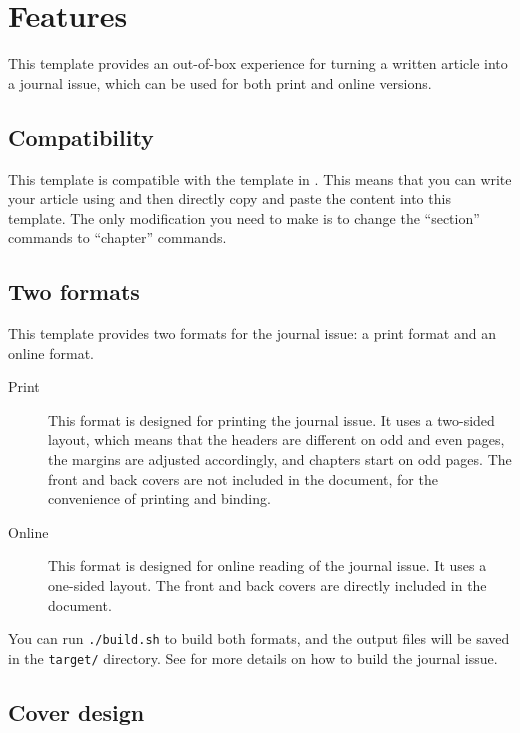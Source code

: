 \chapter{Features}
\label{chap:features}

This template provides an out-of-box experience for turning a written article into a journal issue, which can be used for both print and online versions.

\section{Compatibility}

This template is compatible with the template in \cite{article-template}.
This means that you can write your article using \cite{article-template} and then directly copy and paste the content into this template.
The only modification you need to make is to change the ``section'' commands to ``chapter'' commands.

\section{Two formats}

This template provides two formats for the journal issue: a print format and an online format.

\begin{description}
  \item[Print]
    This format is designed for printing the journal issue.
    It uses a two-sided layout, which means that the headers are different on odd and even pages, the margins are adjusted accordingly, and chapters start on odd pages.
    The front and back covers are not included in the document, for the convenience of printing and binding.
  
  \item[Online]
    This format is designed for online reading of the journal issue.
    It uses a one-sided layout.
    The front and back covers are directly included in the document.
\end{description}

You can run \verb|./build.sh| to build both formats, and the output files will be saved in the \verb|target/| directory.
See  for more details on how to build the journal issue.

\section{Cover design}

